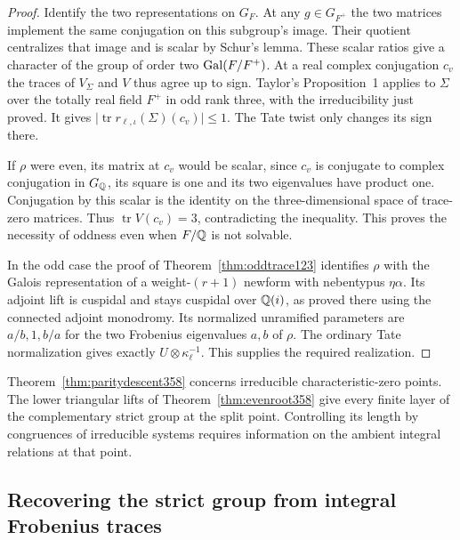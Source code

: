 \documentclass[a4paper,11pt]{article}
\theoremstyle{definition}
\theoremstyle{remark}
\numberwithin{equation}{section}
\begin{document}
\begin{proof}
Identify the two representations on \(G_F\). At any
\(g\in G_{F^+}\) the two matrices implement the same conjugation
on this subgroup's image. Their quotient centralizes that image
and is scalar by Schur's lemma. These scalar ratios give a
character of the group of order two \(\operatorname{Gal}(F/F^+)\).
At a real complex conjugation \(c_v\) the traces of \(V_\Sigma\)
and \(V\) thus agree up to sign. Taylor's Proposition~1 applies
to \(\Sigma\) over the totally real field \(F^+\) in odd rank
three, with the irreducibility just proved. It gives
\(\lvert\operatorname{tr} r_{\ell,\iota}(\Sigma)(c_v)\rvert\le1\).
The Tate twist only changes its sign there.~\cite{VII-V-taylor358}

If \(\rho\) were even, its matrix at \(c_v\) would be scalar,
since \(c_v\) is conjugate to complex conjugation in \(G_\mathbb Q\),
its square is one and its two eigenvalues have product one.
Conjugation by this scalar is the identity on the three-dimensional
space of trace-zero matrices. Thus \(\operatorname{tr}V(c_v)=3\),
contradicting the inequality. This proves the necessity of oddness
even when \(F/\mathbb Q\) is not solvable.

In the odd case the proof of Theorem~\ref{thm:oddtrace123}
identifies \(\rho\) with the Galois representation of a
weight-\((r+1)\) newform with nebentypus \(\eta\alpha\).
Its adjoint lift is cuspidal and stays cuspidal over \(\mathbb Q(i)\),
as proved there using the connected adjoint monodromy. Its
normalized unramified parameters are \(a/b,1,b/a\) for the two
Frobenius eigenvalues \(a,b\) of \(\rho\). The ordinary Tate
normalization gives exactly \(U\otimes\kappa_\ell^{-1}\).
This supplies the required realization.
\end{proof}

Theorem~\ref{thm:paritydescent358} concerns irreducible
characteristic-zero points. The lower triangular lifts of
Theorem~\ref{thm:evenroot358} give every finite layer of the
complementary strict group at the split point. Controlling its
length by congruences of irreducible systems requires information
on the ambient integral relations at that point.


\subsection{Recovering the strict group from integral Frobenius traces}\label{sec:mixedtrace359}
\end{document}
